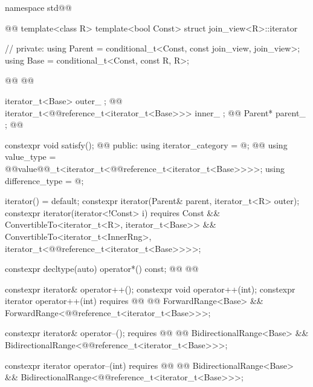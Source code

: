 \begin{codeblock}
namespace std@@ { @@
template<class R>
  template<bool Const>
  struct join_view<R>::iterator { // \expos
  private:
    using Parent = conditional_t<Const, const join_view, join_view>;
    using Base   = conditional_t<Const, const R, R>;

    @@
      @@

    iterator_t<Base> outer_ {}; @\newtxt{// \expos}@
    iterator_t<@@reference_t<iterator_t<Base>>> inner_ {}; @\newtxt{// \expos}@
    Parent* parent_ {}; @\newtxt{// \expos}@

    constexpr void satisfy(); @\newtxt{// \expos}@
  public:
    using iterator_category = @\seebelownc@;
    @@
    using value_type = @@value@@_t<iterator_t<@@reference_t<iterator_t<Base>>>>;
    using difference_type = @\seebelownc@;

    iterator() = default;
    constexpr iterator(Parent& parent, iterator_t<R> outer);
    constexpr iterator(iterator<!Const> i) requires Const &&
      ConvertibleTo<iterator_t<R>, iterator_t<Base>> &&
      ConvertibleTo<iterator_t<InnerRng>,
        iterator_t<@@reference_t<iterator_t<Base>>>>;

    constexpr decltype(auto) operator*() const;
    @@
      @@

    constexpr iterator& operator++();
    constexpr void operator++(int);
    constexpr iterator operator++(int)
      requires @@
        @@ ForwardRange<Base> &&
        ForwardRange<@@reference_t<iterator_t<Base>>>;

    constexpr iterator& operator--();
      requires @@
        @@ BidirectionalRange<Base> &&
        BidirectionalRange<@@reference_t<iterator_t<Base>>>;

    constexpr iterator operator--(int)
      requires @@
        @@ BidirectionalRange<Base> &&
        BidirectionalRange<@@reference_t<iterator_t<Base>>>;

}}
\end{codeblock}
